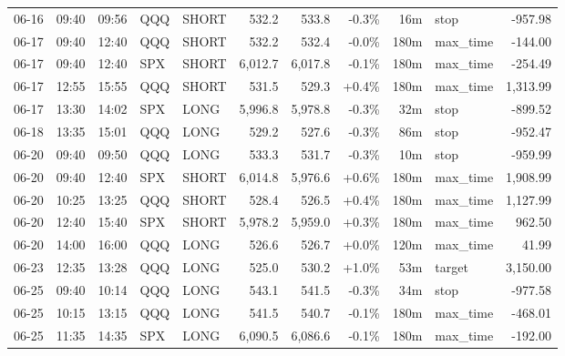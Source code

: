 \documentclass[11pt,a4paper,twoside]{article}
\begin{document}
\begin{center}
\begin{longtable}{>{\color{txtmain}}l l l l l r r r r >{\color{txtmain}}l r}
06-16 & 09:40 & 09:56 & QQQ & SHORT & 532.2 & 533.8 & \textcolor{lossred}{-0.3\%} & 16m & stop & \textcolor{lossred}{-957.98} \\
06-17 & 09:40 & 12:40 & QQQ & SHORT & 532.2 & 532.4 & \textcolor{lossred}{-0.0\%} & 180m & max\_time & \textcolor{lossred}{-144.00} \\
06-17 & 09:40 & 12:40 & SPX & SHORT & 6,012.7 & 6,017.8 & \textcolor{lossred}{-0.1\%} & 180m & max\_time & \textcolor{lossred}{-254.49} \\
06-17 & 12:55 & 15:55 & QQQ & SHORT & 531.5 & 529.3 & \textcolor{wingreen}{+0.4\%} & 180m & max\_time & \textcolor{wingreen}{1,313.99} \\
06-17 & 13:30 & 14:02 & SPX & LONG & 5,996.8 & 5,978.8 & \textcolor{lossred}{-0.3\%} & 32m & stop & \textcolor{lossred}{-899.52} \\
06-18 & 13:35 & 15:01 & QQQ & LONG & 529.2 & 527.6 & \textcolor{lossred}{-0.3\%} & 86m & stop & \textcolor{lossred}{-952.47} \\
06-20 & 09:40 & 09:50 & QQQ & LONG & 533.3 & 531.7 & \textcolor{lossred}{-0.3\%} & 10m & stop & \textcolor{lossred}{-959.99} \\
06-20 & 09:40 & 12:40 & SPX & SHORT & 6,014.8 & 5,976.6 & \textcolor{wingreen}{+0.6\%} & 180m & max\_time & \textcolor{wingreen}{1,908.99} \\
06-20 & 10:25 & 13:25 & QQQ & SHORT & 528.4 & 526.5 & \textcolor{wingreen}{+0.4\%} & 180m & max\_time & \textcolor{wingreen}{1,127.99} \\
06-20 & 12:40 & 15:40 & SPX & SHORT & 5,978.2 & 5,959.0 & \textcolor{wingreen}{+0.3\%} & 180m & max\_time & \textcolor{wingreen}{962.50} \\
06-20 & 14:00 & 16:00 & QQQ & LONG & 526.6 & 526.7 & \textcolor{wingreen}{+0.0\%} & 120m & max\_time & \textcolor{wingreen}{41.99} \\
06-23 & 12:35 & 13:28 & QQQ & LONG & 525.0 & 530.2 & \textcolor{wingreen}{+1.0\%} & 53m & target & \textcolor{wingreen}{3,150.00} \\
06-25 & 09:40 & 10:14 & QQQ & LONG & 543.1 & 541.5 & \textcolor{lossred}{-0.3\%} & 34m & stop & \textcolor{lossred}{-977.58} \\
06-25 & 10:15 & 13:15 & QQQ & LONG & 541.5 & 540.7 & \textcolor{lossred}{-0.1\%} & 180m & max\_time & \textcolor{lossred}{-468.01} \\
06-25 & 11:35 & 14:35 & SPX & LONG & 6,090.5 & 6,086.6 & \textcolor{lossred}{-0.1\%} & 180m & max\_time & \textcolor{lossred}{-192.00} \\

\end{longtable}
\end{center}
\end{document}

